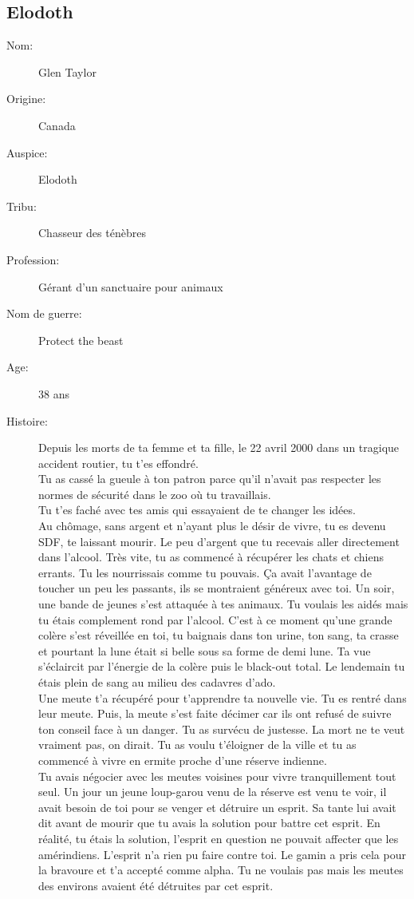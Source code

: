 \documentclass[oneside,12pt]{book}
\begin{document}
\begin{flushleft}
\section{Elodoth}
\begin{description}
\item[Nom:]{Glen Taylor}
\item[Origine:]{Canada}
\item[Auspice:]{Elodoth}
\item[Tribu:]{Chasseur des ténèbres}
\item[Profession:]{Gérant d'un sanctuaire pour animaux}
\item[Nom de guerre:]{Protect the beast}
\item[Age:]{38 ans}
\item[Histoire:]{
Depuis les morts de ta femme et ta fille, le 22 avril 2000 dans un tragique accident routier, tu t'es effondré.\\
Tu as cassé la gueule à ton patron parce qu'il n'avait pas respecter les normes de sécurité dans le zoo où tu travaillais. \\
Tu t'es faché avec tes amis qui essayaient de te changer les idées.\\
Au chômage, sans argent et n'ayant plus le désir de vivre, tu es devenu SDF, te laissant mourir.
Le peu d'argent que tu recevais aller directement dans l'alcool. Très vite, tu as commencé à récupérer les chats et chiens errants. Tu les nourrissais comme tu pouvais. Ça avait l'avantage de toucher un peu les passants, ils se montraient généreux avec toi. Un soir, une bande de jeunes s'est attaquée à tes animaux. Tu voulais les aidés mais tu étais complement rond par l'alcool. C'est à ce moment qu'une grande colère s'est réveillée en toi, tu baignais dans ton urine, ton sang, ta crasse et pourtant la lune était si belle sous sa forme de demi lune. Ta vue s’éclaircit par l'énergie de la colère puis le black-out total. Le lendemain tu étais plein de sang au milieu des cadavres d'ado. \\
Une meute t'a récupéré pour t'apprendre ta nouvelle vie. Tu es rentré dans leur meute. Puis, la meute s'est faite décimer car ils ont refusé de suivre ton conseil face à un danger. Tu as survécu de justesse. La mort ne te veut vraiment pas, on dirait. Tu as voulu t'éloigner de la ville et tu as commencé à vivre en ermite proche d'une réserve indienne. \\
Tu avais négocier avec les meutes voisines pour vivre tranquillement tout seul. Un jour un jeune loup-garou venu de la réserve est venu te voir, il avait besoin de toi pour se venger et détruire un esprit. Sa tante lui avait dit avant de mourir que tu avais la solution pour battre cet esprit. En réalité, tu étais la solution, l'esprit en question ne pouvait affecter que les amérindiens. L'esprit n'a rien pu faire contre toi. Le gamin a pris cela pour la bravoure et t'a accepté comme alpha. Tu ne voulais pas mais les meutes des environs avaient été détruites par cet esprit.
}
\end{description}
\end{flushleft}
\end{document}
